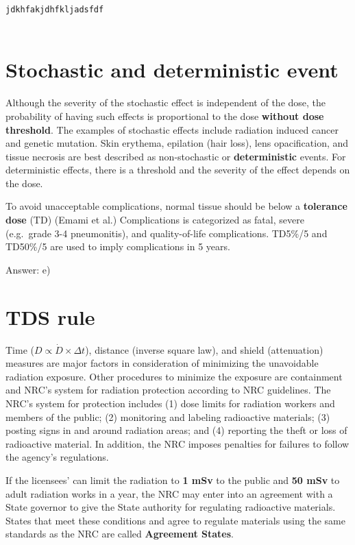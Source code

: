 \documentclass[]{book}
\theoremstyle{definition}
\theoremstyle{definition}
\theoremstyle{definition}
\theoremstyle{remark}
\begin{document}
\begin{verbatim}
jdkhfakjdhfkljadsfdf
  
\end{verbatim}

\section{Stochastic and deterministic
event}\label{stochastic-and-deterministic-event}

Although the severity of the stochastic effect is independent of the
dose, the probability of having such effects is proportional to the dose
\textbf{without dose threshold}. The examples of stochastic effects
include radiation induced cancer and genetic mutation. Skin erythema,
epilation (hair loss), lens opacification, and tissue necrosis are best
described as non-stochastic or \textbf{deterministic} events. For
deterministic effects, there is a threshold and the severity of the
effect depends on the dose.

To avoid unacceptable complications, normal tissue should be below a
\textbf{tolerance dose} (TD) (Emami et al.) Complications is categorized
as fatal, severe (e.g.~grade 3-4 pneumonitis), and quality-of-life
complications. TD5\%/5 and TD50\%/5 are used to imply complications in 5
years.

Answer: e)

\section{TDS rule}\label{tds-rule}

Time (\(D \propto \dot{D}\times \Delta t\)), distance (inverse square
law), and shield (attenuation) measures are major factors in
consideration of minimizing the unavoidable radiation exposure. Other
procedures to minimize the exposure are containment and NRC's system for
radiation protection according to NRC guidelines. The NRC's system for
protection includes (1) dose limits for radiation workers and members of
the public; (2) monitoring and labeling radioactive materials; (3)
posting signs in and around radiation areas; and (4) reporting the theft
or loss of radioactive material. In addition, the NRC imposes penalties
for failures to follow the agency's regulations.

If the licensees' can limit the radiation to \textbf{1 mSv} to the
public and \textbf{50 mSv} to adult radiation works in a year, the NRC
may enter into an agreement with a State governor to give the State
authority for regulating radioactive materials. States that meet these
conditions and agree to regulate materials using the same standards as
the NRC are called \textbf{Agreement States}.
\end{document}
